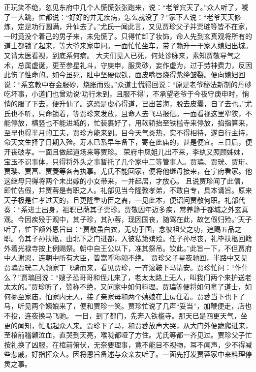 \documentclass[12pt,oneside]{book}
\begin{document}
正玩笑不绝，忽见东府中几个人慌慌张张跑来，说：“老爷宾天了。”众人听了，唬了一大跳，忙都说：“好好的并无疾病，怎么就没了？”家下人说：“老爷天天修炼，定是功行圆满，升仙去了。”尤氏一闻此言，又见贾珍父子并贾琏等皆不在家，一时竟没个着己的男子来，未免慌了。只得忙卸了妆饰，命人先到玄真观将所有的道士都锁了起来，等大爷来家审问。一面忙忙坐车，带了赖升一干家人媳妇出城。又请太医看视，到底系何病。
大夫们见人已死，何处诊脉来，素知贾敬导气之术，总属虚诞，更至参星礼斗，守庚申，服灵砂，妄作虚为，过于劳神费力，反因此伤了性命的。如今虽死，肚中坚硬似铁，面皮嘴唇烧得紫绛皱裂。便向媳妇回说：“系玄教中吞金服砂，烧胀而殁。”众道士慌得回说：“原是老爷秘法新制的丹砂吃坏事，小道们也曾劝说‘功行未到，且服不得’，不承望老爷于今夜守庚申时，悄悄的服了下去，便升仙了。这恐是虔心得道，已出苦海，脱去皮囊，自了去也。”尤氏也不听，只命锁着，等贾珍来发放，且命人去飞马报信。一面看视这里窄狭，不能停放，横竖也不能进城的，忙装裹好了，用软轿抬至铁槛寺来停放，掐指算来，至早也得半月的工夫，贾珍方能来到。目今天气炎热，实不得相待，遂自行主持，命天文生择了日期入殓。寿木已系早年备下，寄在此庙的，甚是便宜。三日后，便开丧破孝。一面且做起道场来等贾珍。
荣府中凤姐儿出不来，李纨又照顾姊妹，宝玉不识事体，只得将外头之事暂托了几个家中二等管事人。贾㻞、贾珖、贾珩、贾璎、贾菖、贾菱等各有执事。尤氏不能回家，便将他继母接来，在宁府看家。他这继母只得将两个未出嫁的小女带来，一并起居，才放心。
且说贾珍闻了此信，即忙告假，并贾蓉是有职之人。礼部见当今隆敦孝弟，不敢自专，具本请旨。原来天子极是仁孝过天的，且更隆重功臣之裔，一见此本，便诏问贾敬何职。礼部代奏：“系进士出身，祖职已荫其子贾珍。贾敬因年迈多疾，常养静于都城之外玄真观。今因疾殁于观中，其子珍，其孙蓉，现因国丧，随驾在此，故乞假归殓。”天子听了，忙下额外恩旨曰：“贾敬虽白衣，无功于国，念彼祖父之功，追赐五品之职。令其子孙扶柩，由北下之门进都，入彼私第殡殓。任子孙尽丧，礼毕扶柩回籍外着光禄寺按上例赐祭。朝中自王公以下，准其祭吊。钦此。”此旨一下，不但贾府中人谢恩，连朝中所有大臣，皆嵩呼称颂不绝。
贾珍父子星夜驰回，半路中又见贾㻞贾珖二人领家丁飞骑而来，看见贾珍，一齐滚鞍下马请安。贾珍忙问：“作什么？”贾㻞回说：“嫂子恐哥哥和侄儿来了，老太太路上无人，叫我们两个来护送老太太的。”贾珍听了，赞称不绝，又问家中如何料理。贾㻞等便将如何拿了道士，如何挪至家庙，怕家内无人，接了亲家母和两个姨娘在上房住着。贾蓉当下也下了马，听见两个姨娘来了，便和贾珍一笑。贾珍忙说了几声“妥当”，加鞭便走，店也不投，连夜换马飞驰。
一日，到了都门，先奔入铁槛寺。那天已是四更天气，坐更的闻知，忙喝起众人来。贾珍下了马，和贾蓉放声大哭，从大门外便跪爬进来，至棺前稽颡泣血，直哭到天亮，喉咙都哑了方住。尤氏等都一齐见过。贾珍父子忙按礼换了凶服，在棺前俯伏，无奈要理事，竟不能目不视物，耳不闻声，少不得减些悲戚，好指挥众人。因将恩旨备述与众亲友听了。一面先打发贾蓉家中来料理停灵之事。
\end{document}
